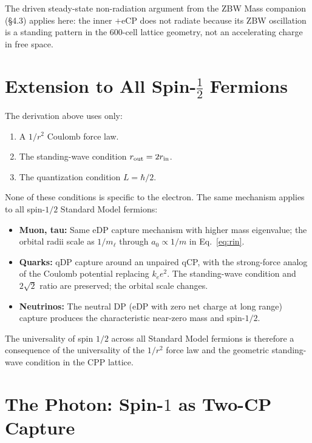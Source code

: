 \documentclass[12pt]{article}
\newcommand{\rin}{r_{\rm in}}
\newcommand{\rout}{r_{\rm out}}
\newcommand{\aBohr}{a_0}
\begin{document}
The driven steady-state non-radiation argument from the ZBW Mass
companion (\S4.3) applies here: the inner $+$eCP does not radiate
because its ZBW oscillation is a standing pattern in the
600-cell lattice geometry, not an accelerating charge in free space.

\section{Extension to All Spin-$\tfrac{1}{2}$ Fermions}
\label{sec:extension}

The derivation above uses only:
\begin{enumerate}[noitemsep]
  \item A $1/r^2$ Coulomb force law.
  \item The standing-wave condition $\rout = 2\rin$.
  \item The quantization condition $L = \hbar/2$.
\end{enumerate}

None of these conditions is specific to the electron.  The same
mechanism applies to all spin-$1/2$ Standard Model fermions:

\begin{itemize}[noitemsep]
  \item \textbf{Muon, tau:} Same eDP capture mechanism with higher
    mass eigenvalue; the orbital radii scale as $1/m_\ell$ through
    $\aBohr \propto 1/m$ in Eq.~\eqref{eq:rin}.
  \item \textbf{Quarks:} qDP capture around an unpaired qCP, with
    the strong-force analog of the Coulomb potential replacing $k_e e^2$.
    The standing-wave condition and $2\sqrt{2}$ ratio are preserved;
    the orbital scale changes.
  \item \textbf{Neutrinos:} The neutral DP (eDP with zero net charge
    at long range) capture produces the characteristic near-zero mass
    and spin-$1/2$.
\end{itemize}

The universality of spin $1/2$ across all Standard Model fermions
is therefore a consequence of the universality of the $1/r^2$ force
law and the geometric standing-wave condition in the CPP lattice.

\section{The Photon: Spin-$1$ as Two-CP Capture}
\label{sec:photon_spin}
\end{document}
